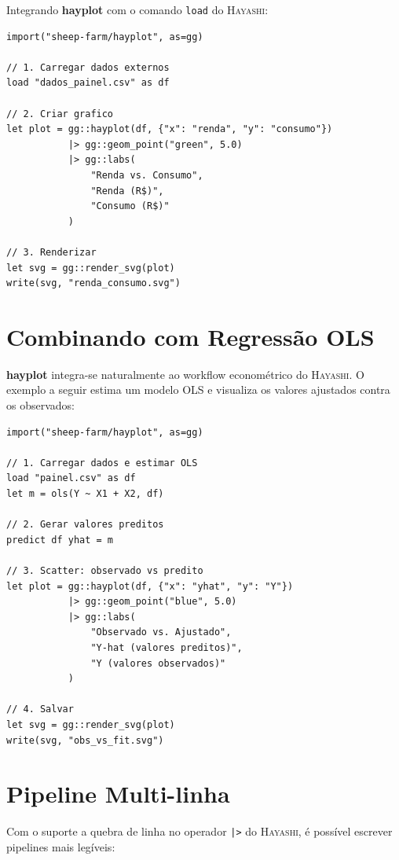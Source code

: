 \documentclass[12pt, a4paper, oneside]{book}
\newcommand{\code}[1]{\texttt{#1}}
\newcommand{\hayashi}{\textsc{Hayashi}}
\newcommand{\hayplot}{\textbf{hayplot}}
\begin{document}
Integrando \hayplot{} com o comando \code{load} do \hayashi{}:

\begin{lstlisting}[caption={Plot a partir de um arquivo externo}]
import("sheep-farm/hayplot", as=gg)

// 1. Carregar dados externos
load "dados_painel.csv" as df

// 2. Criar grafico
let plot = gg::hayplot(df, {"x": "renda", "y": "consumo"})
           |> gg::geom_point("green", 5.0)
           |> gg::labs(
               "Renda vs. Consumo",
               "Renda (R$)",
               "Consumo (R$)"
           )

// 3. Renderizar
let svg = gg::render_svg(plot)
write(svg, "renda_consumo.svg")
\end{lstlisting}

\section{Combinando com Regressão OLS}

\hayplot{} integra-se naturalmente ao workflow econométrico do \hayashi{}.
O exemplo a seguir estima um modelo OLS e visualiza os valores ajustados
contra os observados:

\begin{lstlisting}[caption={Visualizando valores ajustados de uma regressão OLS}]
import("sheep-farm/hayplot", as=gg)

// 1. Carregar dados e estimar OLS
load "painel.csv" as df
let m = ols(Y ~ X1 + X2, df)

// 2. Gerar valores preditos
predict df yhat = m

// 3. Scatter: observado vs predito
let plot = gg::hayplot(df, {"x": "yhat", "y": "Y"})
           |> gg::geom_point("blue", 5.0)
           |> gg::labs(
               "Observado vs. Ajustado",
               "Y-hat (valores preditos)",
               "Y (valores observados)"
           )

// 4. Salvar
let svg = gg::render_svg(plot)
write(svg, "obs_vs_fit.svg")
\end{lstlisting}

\section{Pipeline Multi-linha}

Com o suporte a quebra de linha no operador \code{|>} do \hayashi{}, é
possível escrever pipelines mais legíveis:
\end{document}

